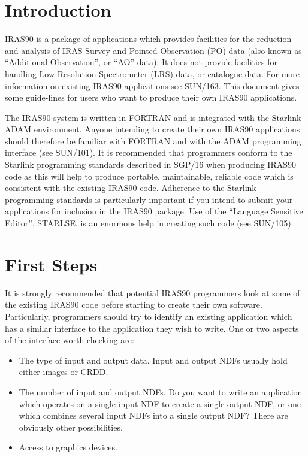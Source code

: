 \setlength{\parskip}{0mm} \tableofcontents
\setlength{\parskip}{\medskipamount} \markright{\stardocname}

\newpage

\section{Introduction}
{\small IRAS90} is a package of applications which provides facilities for the
reduction and analysis of {\small IRAS} Survey and Pointed Observation (PO) data
(also known as ``Additional Observation'', or ``AO'' data). It does not provide
facilities for handling Low Resolution Spectrometer (LRS) data, or catalogue
data. For more information on existing {\small IRAS90} applications see SUN/163.
This document gives some guide-lines for users who want to produce their own
{\small IRAS90} applications. 

The {\small IRAS90} system is written in {\small FORTRAN} and is integrated with
the Starlink {\small ADAM} environment. Anyone intending to create their own 
{\small IRAS90} applications should therefore be familiar with {\small FORTRAN} 
and with the {\small ADAM} programming interface (see SUN/101). It is 
recommended that programmers conform to the Starlink programming standards 
described in SGP/16 when producing {\small IRAS90} code as this will help to 
produce portable, maintainable, reliable code which is consistent with the 
existing {\small IRAS90} code. Adherence to the Starlink programming standards 
is particularly important if you intend to submit your applications for 
inclusion in the {\small IRAS90} package. Use of the ``Language Sensitive 
Editor'', {\small STARLSE}, is an enormous help in creating such code (see 
SUN/105).

\section{First Steps}
It is strongly recommended that potential {\small IRAS90} programmers look at some of
the existing {\small IRAS90} code before starting to create their own software.
Particularly, programmers should try to identify an existing application which
has a similar interface to the application they wish to write. One or two
aspects of the interface worth checking are: 

\begin{itemize}
\item The type of input and output data. Input and output {\small NDF}s usually 
hold either images or {\small CRDD}.
\item The number of input and output NDFs. Do you want to write an application 
which operates on a single input {\small NDF} to create a single output {\small 
NDF}, or one which combines several input {\small NDF}s into a single output
{\small NDF}? There are obviously other possibilities.
\item Access to graphics devices.
\end{itemize}


